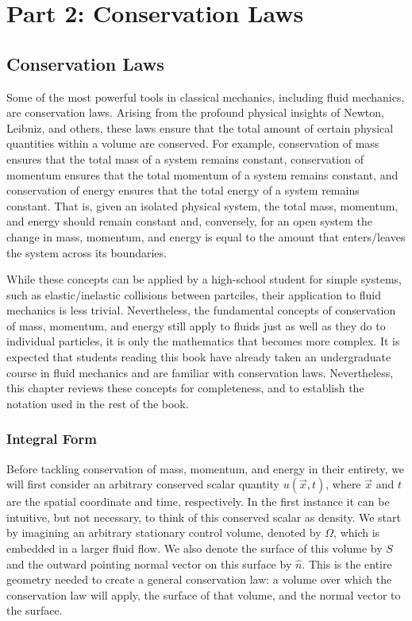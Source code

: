 \part{Part 2: Conservation Laws}


\chapter{Conservation Laws}
Some of the most powerful tools in classical mechanics, including fluid mechanics, are conservation laws. Arising from the profound physical insights of Newton, Leibniz, and others, these laws ensure that the total amount of certain physical quantities within a volume are conserved. For example, conservation of mass ensures that the total mass of a system remains constant, conservation of momentum ensures that the total momentum of a system remains constant, and conservation of energy ensures that the total energy of a system remains constant. That is, given an isolated physical system, the total mass, momentum, and energy should remain constant and, conversely, for an open system the change in mass, momentum, and energy is equal to the amount that enters/leaves the system across its boundaries.

While these concepts can be applied by a high-school student for simple systems, such as elastic/inelastic collisions between partciles, their application to fluid mechanics is less trivial. Nevertheless, the fundamental concepts of conservation of mass, momentum, and energy still apply to fluids just as well as they do to individual particles, it is only the mathematics that becomes more complex. It is expected that students reading this book have already taken an undergraduate course in fluid mechanics and are familiar with conservation laws. Nevertheless, this chapter reviews these concepts for completeness, and to establish the notation used in the rest of the book.

\section{Integral Form}
Before tackling conservation of mass, momentum, and energy in their entirety, we will first consider an arbitrary conserved scalar quantity $u(\vec{x},t)$, where $\vec{x}$ and $t$ are the spatial coordinate and time, respectively. In the first instance it can be intuitive, but not necessary, to think of this conserved scalar as density. We start by imagining an arbitrary stationary control volume, denoted by $\Omega$, which is embedded in a larger fluid flow. We also denote the surface of this volume by $S$ and the outward pointing normal vector on this surface by $\hat{n}$. This is the entire geometry needed to create a general conservation law: a volume over which the conservation law will apply, the surface of that volume, and the normal vector to the surface.

